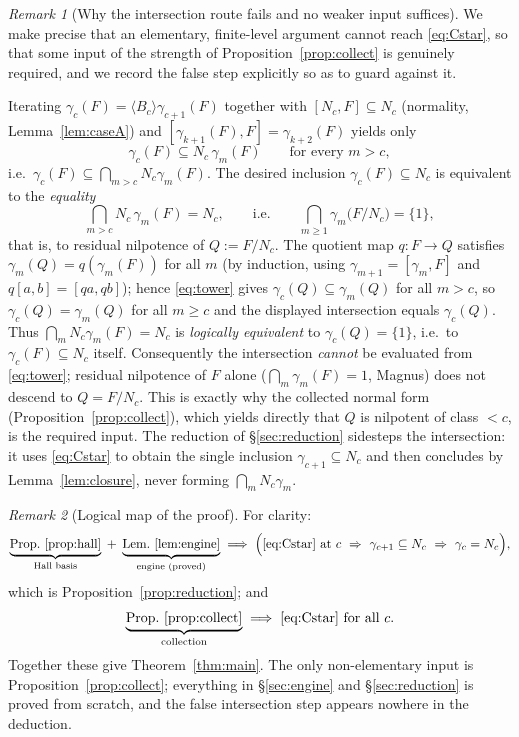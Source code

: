 \documentclass{amsart}
\theoremstyle{definition}
\theoremstyle{remark}
\newtheorem{remark}{Remark}
\begin{document}
\begin{remark}[Why the intersection route fails and no weaker input suffices]
\label{rem:gap}
We make precise that an elementary, finite-level argument cannot reach
\eqref{eq:Cstar}, so that some input of the strength of
Proposition~\ref{prop:collect} is genuinely required, and we record the false
step explicitly so as to guard against it.

Iterating $\gamma_c(F)=\langle B_c\rangle\gamma_{c+1}(F)$ together with
$[N_c,F]\subseteq N_c$ (normality, Lemma~\ref{lem:caseA}) and
$[\gamma_{k+1}(F),F]=\gamma_{k+2}(F)$ yields only
\begin{equation}\label{eq:tower}
\gamma_c(F)\subseteq N_c\,\gamma_m(F)\qquad\text{for every }m>c,
\end{equation}
i.e.\ $\gamma_c(F)\subseteq\bigcap_{m>c}N_c\gamma_m(F)$. The desired inclusion
$\gamma_c(F)\subseteq N_c$ is equivalent to the \emph{equality}
\[
\bigcap_{m>c}N_c\,\gamma_m(F)=N_c,
\qquad\text{i.e.}\qquad
\bigcap_{m\ge1}\gamma_m\!\big(F/N_c\big)=\{1\},
\]
that is, to residual nilpotence of $Q:=F/N_c$. The quotient map $q\colon F\to Q$
satisfies $\gamma_m(Q)=q(\gamma_m(F))$ for all $m$ (by induction, using
$\gamma_{m+1}=[\gamma_m,F]$ and $q[a,b]=[qa,qb]$); hence \eqref{eq:tower} gives
$\gamma_c(Q)\subseteq\gamma_m(Q)$ for all $m>c$, so
$\gamma_c(Q)=\gamma_m(Q)$ for all $m\ge c$ and the displayed intersection equals
$\gamma_c(Q)$. Thus $\bigcap_m N_c\gamma_m(F)=N_c$ is \emph{logically equivalent}
to $\gamma_c(Q)=\{1\}$, i.e.\ to $\gamma_c(F)\subseteq N_c$ itself. Consequently
the intersection \emph{cannot} be evaluated from \eqref{eq:tower}; residual
nilpotence of $F$ alone ($\bigcap_m\gamma_m(F)=1$, Magnus) does not descend to
$Q=F/N_c$. This is exactly why the collected normal form
(Proposition~\ref{prop:collect}), which yields directly that $Q$ is nilpotent of
class $<c$, is the required input. The reduction of \S\ref{sec:reduction}
sidesteps the intersection: it uses \eqref{eq:Cstar} to obtain the single
inclusion $\gamma_{c+1}\subseteq N_c$ and then concludes by
Lemma~\ref{lem:closure}, never forming $\bigcap_m N_c\gamma_m$.
\end{remark}

\begin{remark}[Logical map of the proof]\label{rem:map}
For clarity:
\[
\underbrace{\text{Prop.\ \ref{prop:hall}}}_{\text{Hall basis}}
\;+\;
\underbrace{\text{Lem.\ \ref{lem:engine}}}_{\text{engine (proved)}}
\;\Longrightarrow\;
\Big(\text{\eqref{eq:Cstar} at }c\ \Rightarrow\ \gamma_{c+1}\subseteq N_c
\ \Rightarrow\ \gamma_c=N_c\Big),
\]
which is Proposition~\ref{prop:reduction}; and
\[
\underbrace{\text{Prop.\ \ref{prop:collect}}}_{\text{collection}}
\;\Longrightarrow\;
\text{\eqref{eq:Cstar} for all }c .
\]
Together these give Theorem~\ref{thm:main}. The only non-elementary input is
Proposition~\ref{prop:collect}; everything in \S\ref{sec:engine}
and \S\ref{sec:reduction} is proved from scratch, and the false intersection step
appears nowhere in the deduction.
\end{remark}
\end{document}
